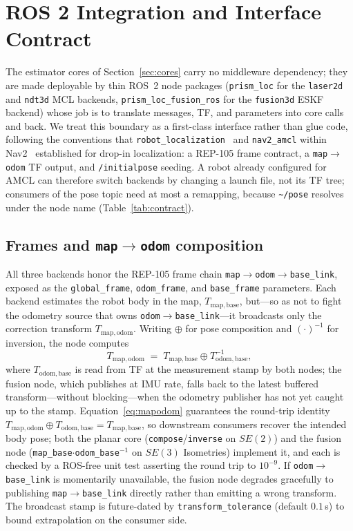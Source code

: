 \section{ROS 2 Integration and Interface Contract}\label{sec:ros}

The estimator cores of Section~\ref{sec:cores} carry no middleware
dependency; they are made deployable by thin ROS~2 node packages
(\texttt{prism\_loc} for the \texttt{laser2d} and \texttt{ndt3d} MCL
backends, \texttt{prism\_loc\_fusion\_ros} for the \texttt{fusion3d}
ESKF backend) whose job is to translate messages, TF, and parameters
into core calls and back. We treat this boundary as a first-class
interface rather than glue code, following the conventions that
\texttt{robot\_localization}~\cite{moore2014generalized} and
\texttt{nav2\_amcl} within Nav2~\cite{macenski2020marathon}
established for drop-in localization: a REP-105 frame contract, a
\texttt{map}$\to$\texttt{odom} TF output, and \texttt{/initialpose}
seeding. A robot already configured for AMCL can therefore switch
backends by changing a launch file, not its TF tree; consumers of the
pose topic need at most a remapping, because
\texttt{\textasciitilde/pose} resolves under the node name
(Table~\ref{tab:contract}).

\subsection{Frames and \texttt{map}$\to$\texttt{odom} composition}
All three backends honor the REP-105 frame chain
\texttt{map}$\to$\texttt{odom}$\to$\texttt{base\_link}, exposed as the
\texttt{global\_frame}, \texttt{odom\_frame}, and \texttt{base\_frame}
parameters. Each backend estimates the robot body in the map,
$T_{\mathrm{map,base}}$, but---so as not to fight the odometry source
that owns \texttt{odom}$\to$\texttt{base\_link}---it broadcasts only
the correction transform $T_{\mathrm{map,odom}}$. Writing $\oplus$ for
pose composition and $(\cdot)^{-1}$ for inversion, the node computes
\begin{equation}
  T_{\mathrm{map,odom}} \;=\;
  T_{\mathrm{map,base}} \oplus T_{\mathrm{odom,base}}^{-1},
  \label{eq:mapodom}
\end{equation}
where $T_{\mathrm{odom,base}}$ is read from TF at the measurement
stamp by both nodes; the fusion node, which publishes at IMU rate,
falls back to the latest buffered transform---without blocking---when
the odometry publisher has not yet caught up to the stamp. Equation~\eqref{eq:mapodom} guarantees the round-trip identity
$T_{\mathrm{map,odom}} \oplus T_{\mathrm{odom,base}} =
T_{\mathrm{map,base}}$, so downstream consumers recover the intended
body pose; both the planar core
(\texttt{compose}/\texttt{inverse} on $SE(2)$) and the fusion node
(\texttt{map\_base}$\cdot$\texttt{odom\_base}$^{-1}$ on $SE(3)$
Isometries) implement it, and each is checked by a ROS-free unit test
asserting the round trip to $10^{-9}$. If \texttt{odom}$\to$\texttt{base\_link}
is momentarily unavailable, the fusion node degrades gracefully to
publishing \texttt{map}$\to$\texttt{base\_link} directly rather than
emitting a wrong transform. The broadcast stamp is future-dated by
\texttt{transform\_tolerance} (default $0.1$\,s) to bound
extrapolation on the consumer side.

